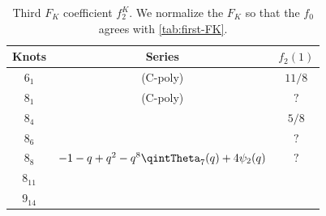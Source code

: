 \documentclass[11pt,e-only]{amsart}
\begin{document}
\begin{table}[h!]
    \centering
    \begin{tabular}{|c|c|c|}
        \hline
        Knots & Series & $f_2(1)$\\
        \hline
        $6_1$ & (C-poly) & $11/8$ \\
        $8_1$ & (C-poly) & $?$ \\
        $8_4$ & & $5/8$ \\
        $8_6$ & &  $?$ \\
        $8_8$ & $ -1-q+q^2-q^8 \qintTheta_7(q)+4\psi_2(q)$ & $?$ \\ %
        $8_{11}$ & & \\
        $9_{14}$ & & \\
        \hline
    \end{tabular}
    \caption{Third $F_K$ coefficient $f_2^K$. We normalize the $F_K$ so that the $f_0$ agrees with \cref{tab:first-FK}.}
    \label{tab:third-FK}
\end{table}

\end{document}
